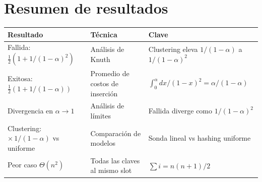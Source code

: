 \documentclass[11pt, letterpaper]{article}
\theoremstyle{definition}
\theoremstyle{plain}
\theoremstyle{remark}
\begin{document}
\section{Resumen de resultados}

\begin{table}[h]
\centering
\begin{tabular}{llp{5.5cm}}
\toprule
\textbf{Resultado} & \textbf{Técnica} & \textbf{Clave} \\
\midrule
Fallida: $\frac{1}{2}(1 + 1/(1{-}\alpha)^2)$
  & Análisis de Knuth
  & Clustering eleva $1/(1{-}\alpha)$ a $1/(1{-}\alpha)^2$ \\
Exitosa: $\frac{1}{2}(1 + 1/(1{-}\alpha))$
  & Promedio de costos de inserción
  & $\int_0^\alpha dx/(1{-}x)^2 = \alpha/(1{-}\alpha)$ \\
Divergencia en $\alpha \to 1$
  & Análisis de límites
  & Fallida diverge como $1/(1{-}\alpha)^2$ \\
Clustering: ${\times}\,1/(1{-}\alpha)$ vs uniforme
  & Comparación de modelos
  & Sonda lineal vs hashing uniforme \\
Peor caso $\Theta(n^2)$
  & Todas las claves al mismo slot
  & $\sum i = n(n{+}1)/2$ \\
\bottomrule
\end{tabular}
\end{table}
\end{document}
